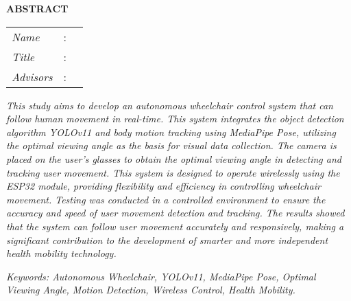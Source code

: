 \begin{center}
  \large\textbf{ABSTRACT}
\end{center}


\vspace{2ex}

\begingroup
\setlength{\tabcolsep}{0pt}

\noindent
\begin{tabularx}{\textwidth}{l >{\centering}m{3em} X}
  \emph{Name}     & : & \name{}         \\

  \emph{Title}    & : & \engtatitle{}   \\

  \emph{Advisors} & : & \advisor{}   \\
\end{tabularx}
\endgroup

\emph{This study aims to develop an autonomous wheelchair control system that can follow human movement in real-time. This system integrates the object detection algorithm \emph{YOLOv11} and body motion tracking using MediaPipe Pose, utilizing the optimal viewing angle as the basis for visual data collection. The camera is placed on the user's glasses to obtain the optimal viewing angle in detecting and tracking user movement. This system is designed to operate wirelessly using the ESP32 module, providing flexibility and efficiency in controlling wheelchair movement. Testing was conducted in a controlled environment to ensure the accuracy and speed of user movement detection and tracking. The results showed that the system can follow user movement accurately and responsively, making a significant contribution to the development of smarter and more independent health mobility technology.}

\emph{Keywords: Autonomous Wheelchair, YOLOv11, MediaPipe Pose, Optimal Viewing Angle, Motion Detection, Wireless Control, Health Mobility.}
